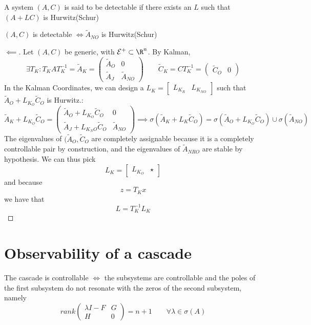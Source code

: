 \documentclass[english]{lectures}
\begin{document}
\begin{definition}[detectability]
    A system $(A,C)$ is said to be detectable if there exists an $L$ such that $(A+LC)$ is Hurwitz(Schur)
\end{definition}

\begin{theorem}
    $(A,C)$ is detectable $\iff\tilde{A}_{NO}$ is Hurwitz(Schur)
\end{theorem}
\begin{proof}[$\impliedby$]
    Let $(A,C)$ be generic, with $\mathcal{E}^+\subset \R^n$. By Kalman,
    \[
    \exists T_K:T_KAT_K^{-1}=\tilde{A}_K=\begin{pmatrix}
        \tilde{A}_O & 0\\
        \tilde{A}_J & \tilde{A}_{NO}
    \end{pmatrix} \qquad \tilde{C}_K=CT_K^{-1}=\begin{pmatrix}
        \tilde{C}_O & 0
    \end{pmatrix}
    \]
    In the Kalman Coordinates, we can design a $L_K=\begin{bmatrix}
        L_{K_R} & L_{K_{NO}}
    \end{bmatrix}$ such that $\tilde{A}_O+L_{K_O}\tilde{C}_O$ is Hurwitz.:
    \[
        \tilde{A}_K+L_{K_O}\tilde{C}_O=\begin{pmatrix}
            \tilde{A}_O+L_{K_O}\tilde{C}_O & 0\\
            \tilde{A}_J+L_{K_NO}\tilde{C}_O & \tilde{A}_{NO}
        \end{pmatrix} \implies \sigma(\tilde{A}_K+L_{K}\tilde{C}_O)=\sigma(\tilde{A}_O+L_{K_O}\tilde{C}_O)\cup \sigma(\tilde{A}_{NO})
    \]
    The eigenvalues of $(\tilde{A}_O,\tilde{C}_O$ are completely assignable because it is a completely controllable pair by construction, and the eigenvalues of $\tilde{A}_{NRO}$ are stable by hypothesis. We can thus pick
    \[
    L_K=\begin{bmatrix}
        L_{K_O} & \star
    \end{bmatrix}
    \]
    and because
    \[
    z=T_Kx
    \]
    we have that
    \[
    L=T_K^{-1}L_K
    \]
\end{proof}


\section{Observability of a cascade}
\begin{result}
    The cascade is controllable $\iff$ the subsystems are controllable and the poles of the first subsystem do not resonate with the zeros of the second subsystem, namely
    \[
    rank\begin{pmatrix}
        \lambda I - F & G\\
        H & 0
    \end{pmatrix}=n+1 \qquad \forall \lambda \in \sigma(A)
    \]
\end{result}
\end{document}
